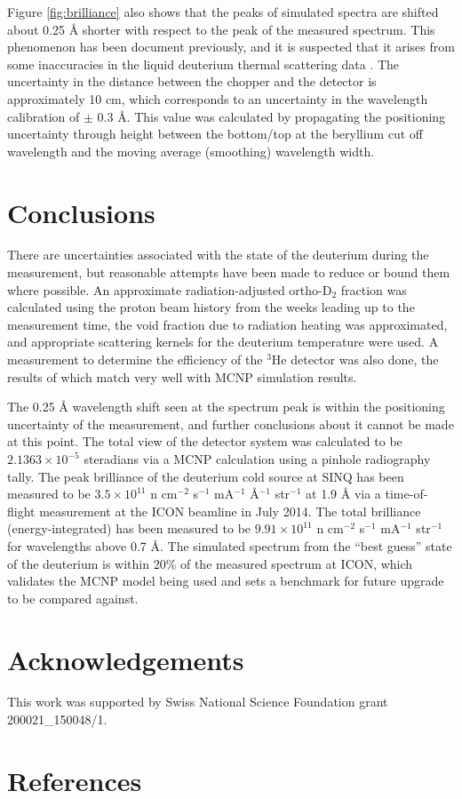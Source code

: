 \documentclass[5p,12pt]{elsarticle}
\begin{document}
Figure \ref{fig:brilliance} also shows that the peaks of simulated spectra are shifted about 0.25 {\AA} shorter with respect to the peak of the measured spectrum.  This phenomenon has been document previously, and it is suspected that it arises from some inaccuracies in the liquid deuterium thermal scattering data \cite{giller_thesis}.  The uncertainty in the distance between the chopper and the detector is approximately 10 cm, which corresponds to an uncertainty in the wavelength calibration of $\pm$ 0.3 {\AA}.  This value was calculated by propagating the positioning uncertainty through height between the bottom/top at the beryllium cut off wavelength and the moving average (smoothing) wavelength width.  

%
%
%
%
%

\section{Conclusions}
\label{sec:conclusions}

There are uncertainties associated with the state of the deuterium during the measurement, but reasonable attempts have been made to reduce or bound them where possible.  An approximate radiation-adjusted ortho-D$_2$ fraction was calculated using the proton beam history from the weeks leading up to the measurement time, the void fraction due to radiation heating was approximated, and appropriate scattering kernels for the deuterium temperature were used.  A measurement to determine the efficiency of the $^3$He detector was also done, the results of which match very well with MCNP simulation results.

The 0.25 {\AA} wavelength shift seen at the spectrum peak is within the positioning uncertainty of the measurement, and further conclusions about it cannot be made at this point.  The total view of the detector system was calculated to be $2.1363\times10^{-5}$ steradians via a MCNP calculation using a pinhole radiography tally.  The peak brilliance of the deuterium cold source at SINQ has been measured to be $3.5\times10^{11}$ n cm$^{-2}$ s$^{-1}$ mA$^{-1}$ \AA$^{-1}$ str$^{-1}$ at 1.9 {\AA} via a time-of-flight measurement at the ICON beamline in July 2014.  The total brilliance (energy-integrated) has been measured to be  $9.91\times10^{11}$  n cm$^{-2}$ s$^{-1}$ mA$^{-1}$ str$^{-1}$ for wavelengths above 0.7 {\AA}.  The simulated spectrum from the ``best guess'' state of the deuterium is within 20\% of the measured spectrum at ICON, which validates the MCNP model being used and sets a benchmark for future upgrade to be compared against.  

%
%
%
%
%

\section*{Acknowledgements}
\label{sec:ack}

This work was supported by Swiss National Science Foundation grant 200021\_150048/1.

%
%
%
%
%

\section*{References}


\end{document}
